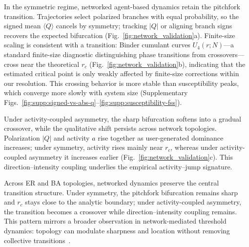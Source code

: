 \documentclass[12pt]{article}
\begin{document}
In the symmetric regime, networked agent-based dynamics retain the pitchfork transition. Trajectories select polarized branches with equal probability, so the signed mean $\langle Q\rangle$ cancels by symmetry; tracking $|Q|$ or aligning branch signs recovers the expected bifurcation (Fig.~\ref{fig:network_validation}a). Finite-size scaling is consistent with a transition: Binder cumulant curves $U_4(r;N)$---a standard finite-size diagnostic distinguishing phase transitions from crossovers---cross near the theoretical $r_c$ (Fig.~\ref{fig:network_validation}b), indicating that the estimated critical point is only weakly affected by finite-size corrections within our resolution. This crossing behavior is more stable than susceptibility peaks, which converge more slowly with system size (Supplementary Figs.~\ref{fig:supp:signed-vs-abs-q}--\ref{fig:supp:susceptibility-fss}).

Under activity-coupled asymmetry, the sharp bifurcation softens into a gradual crossover, while the qualitative shift persists across network topologies. Polarization $|Q|$ and activity $a$ rise together as user-generated dominance increases; under symmetry, activity rises mainly near $r_c$, whereas under activity-coupled asymmetry it increases earlier (Fig.~\ref{fig:network_validation}c). This direction--intensity coupling underlies the empirical activity--jump signature.

Across ER and BA topologies, networked dynamics preserve the central transition structure. Under symmetry, the pitchfork bifurcation remains sharp and $r_c$ stays close to the analytic boundary; under activity-coupled asymmetry, the transition becomes a crossover while direction--intensity coupling remains. This pattern mirrors a broader observation in network-mediated threshold dynamics: topology can modulate sharpness and location without removing collective transitions~\cite{Watts2002,Centola2010,Centola2018Tipping,Iacopini2019}.
\end{document}
